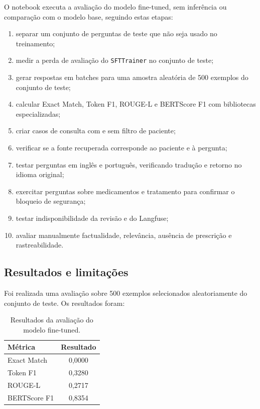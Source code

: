 \documentclass[12pt,a4paper]{article}
\begin{document}
O notebook executa a avaliação do modelo fine-tuned, sem inferência ou comparação com o modelo base, seguindo estas etapas:
\begin{enumerate}
  \item separar um conjunto de perguntas de teste que não seja usado no treinamento;
  \item medir a perda de avaliação do \texttt{SFTTrainer} no conjunto de teste;
  \item gerar respostas em batches para uma amostra aleatória de 500 exemplos do conjunto de teste;
  \item calcular Exact Match, Token F1, ROUGE-L e BERTScore F1 com bibliotecas especializadas;
  \item criar casos de consulta com e sem filtro de paciente;
  \item verificar se a fonte recuperada corresponde ao paciente e à pergunta;
  \item testar perguntas em inglês e português, verificando tradução e retorno no idioma original;
  \item exercitar perguntas sobre medicamentos e tratamento para confirmar o bloqueio de segurança;
  \item testar indisponibilidade da revisão e do Langfuse;
  \item avaliar manualmente factualidade, relevância, ausência de prescrição e rastreabilidade.
\end{enumerate}

\subsection{Resultados e limitações}

Foi realizada uma avaliação sobre 500 exemplos selecionados aleatoriamente do conjunto de teste. Os resultados foram:

\begin{table}[ht]
\centering
\caption{Resultados da avaliação do modelo fine-tuned.}
\label{tab:avaliacao-finetuned}
\begin{tabular}{lc}
Métrica & Resultado \\
\hline
Exact Match & 0,0000 \\
Token F1 & 0,3280 \\
ROUGE-L & 0,2717 \\
BERTScore F1 & 0,8354 \\
\end{tabular}
\end{table}
\end{document}
